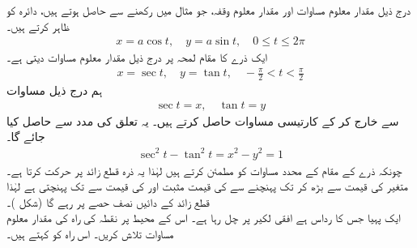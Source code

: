درج ذیل مقدار معلوم مساوات اور مقدار معلوم وقفہ، جو مثال  میں   رکھنے سے حاصل ہوتے ہیں، دائرہ  کو ظاہر کرتے ہیں۔
\begin{align*}
x=a\cos t,\quad y=a\sin t,\quad 0\le t\le 2\pi
\end{align*}
ایک ذرے کا مقام لمحہ  پر درج ذیل مقدار معلوم مساوات دیتی  ہے۔
\begin{align*}
x=\sec t,\quad y=\tan t,\quad -\frac{\pi}{2}<t<\frac{\pi}{2}
\end{align*}
ہم درج ذیل مساوات
\begin{align*}
\sec t=x,\quad \tan t=y
\end{align*}
 سے  خارج کر کے کارتیسی مساوات حاصل کرتے ہیں۔ یہ تعلق  کی مدد سے حاصل  کیا جائے گا۔
\begin{align*}
\sec^2t-\tan^2t=x^2-y^2=1
\end{align*}
چونکہ ذرے کے مقام کے محدد  مساوات  کو مطمئن کرتے ہیں لہٰذا یہ ذرہ قطع زائد پر حرکت کرتا ہے۔ متغیر  کی قیمت  سے بڑھ کر  تک پہنچنے سے  کی قیمت مثبت اور  کی قیمت  سے  تک  پہنچتی ہے لہٰذا  قطع زائد کے دائیں  نصف حصے پر رہے گا (شکل )۔  
\\
ایک پہیا جس کا رداس  ہے افقی لکیر پر چل رہا ہے۔ اس کے محیط پر نقطہ  کی راہ کی  مقدار معلوم مساوات تلاش  کریں۔ اس راہ کو  کہتے ہیں۔

